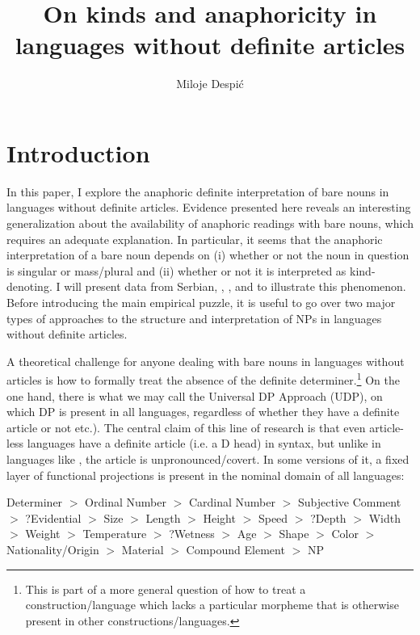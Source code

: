 \documentclass[output=paper,
modfonts
]{langscibook}
\title{On kinds and anaphoricity in languages without definite articles}
\author{%
	Miloje Despi\'c\affiliation{Cornell University}
}
\begin{document}
	\maketitle
	\section{Introduction}
	In this paper, I explore the anaphoric definite interpretation of bare nouns in languages without definite articles. Evidence presented here reveals an interesting generalization about the availability of anaphoric readings with bare nouns, which requires an adequate explanation. In particular, it seems that the anaphoric interpretation of a bare noun depends on (i) whether or not the noun in question is singular or mass/plural and (ii) whether or not it is interpreted as kind-denoting. I will present data from Serbian, , ,  and  to illustrate this phenomenon. Before introducing the main empirical puzzle, it is useful to go over two major types of approaches to the structure and interpretation of NPs in languages without definite articles.
	
	A theoretical challenge for anyone dealing with bare nouns in languages without articles is how to formally treat the absence of the definite determiner.\footnote{This is part of a more general question of how to treat a construction/language which lacks a particular morpheme that is otherwise present in other constructions/languages.}  On the one hand, there is what we may call the Universal DP Approach (UDP), on which DP is present in all languages, regardless of whether they have a definite article or not  \citep[e.g.][]{Longobardi1994,Cinque1994,Scott2002,Pereltsvaig2007} etc.). The central claim of this line of research is that even article-less languages have a definite article (i.e. a D head) in syntax, but unlike in languages like , the article is unpronounced/covert. In some versions of it, a fixed layer of functional projections is present in the nominal domain of all languages:
	
	\ea \label{ex:despic:1} 
	{Determiner} $>$ {Ordinal Number} $>$ {Cardinal Number} $>$ {Subjective Comment} $>$ {?Evidential} $>$ {Size} $>$ {Length} $>$ {Height} $>$ {Speed} $>$ {?Depth} $>$ {Width} $>$ {Weight} $>$ {Temperature} $>$ {?Wetness} $>$ {Age} $>$ {Shape} $>$ {Color} $>$ {Nationality/Origin} $>$ {Material} $>$ {Compound Element} $>$ {NP}	\citep[114]{Scott2002} 
	\z
	
\end{document}
